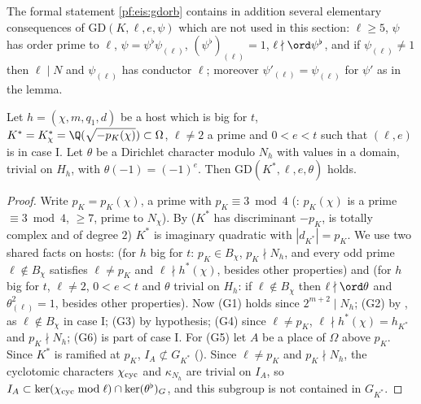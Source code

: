 \begin{remark}\label{pf:eis:gdrem}
The formal statement \cref{pf:eis:gdorb} contains in addition several elementary consequences of
$\mathrm{GD}(K,\ell,e,\psi)$ which are not used in this section: $\ell\ge5$, $\psi$ has order prime to $\ell$,
$\psi=\psi^\flat\psi_{(\ell)}$, $(\psi^\flat)_{(\ell)}=1$, $\ell\nmid\ord\psi^\flat$, and if $\psi_{(\ell)}\ne1$ then $\ell\mid N$ and
$\psi_{(\ell)}$ has conductor $\ell$; moreover $\psi'_{(\ell)}=\psi_{(\ell)}$ for $\psi'$ as in the lemma.
\end{remark}

\begin{lemma}\label{pf:eis:gdhost}
Let $h=(\chi,m,q_1,d)$ be a host which is big for $t$, $K^*=K^*_\chi=\Q(\sqrt{-p_K(\chi)})\subset\Omega$, $\ell\ne2$ a prime and
$0<e<t$ such that $(\ell,e)$ is in case I. Let $\theta$ be a Dirichlet character modulo $N_h$ with values in a domain,
trivial on $H_h$, with $\theta(-1)=(-1)^e$. Then $\mathrm{GD}(K^*,\ell,e,\theta)$ holds.
\end{lemma}

\begin{proof}
Write $p_K=p_K(\chi)$, a prime with $p_K\equiv3\bmod4$ (: $p_K(\chi)$ is a
prime $\equiv3\bmod4$, $\ge7$, prime to $N_\chi$). By  ($K^*$ has discriminant $-p_K$, is
totally complex and of degree $2$) $K^*$ is imaginary quadratic with $|d_{K^*}|=p_K$. We use two shared facts on
hosts:  (for $h$ big for $t$: $p_K\in B_\chi$, $p_K\nmid N_h$, and every odd prime
$\ell\notin B_\chi$ satisfies $\ell\ne p_K$ and $\ell\nmid h^*(\chi)$, besides other properties) and
 (for $h$ big for $t$, $\ell\ne2$, $0<e<t$ and $\theta$ trivial on $H_h$: if $\ell\notin B_\chi$ then
$\ell\nmid\ord\theta$ and $\theta_{(\ell)}^2=1$, besides other properties). Now (G1) holds since $2^{m+2}\mid N_h$; (G2) by
, as $\ell\notin B_\chi$ in case I; (G3) by hypothesis; (G4) since $\ell\ne p_K$,
$\ell\nmid h^*(\chi)=h_{K^*}$ and $p_K\nmid N_h$; (G6) is part of case I. For (G5) let $A$ be a place of $\Omega$ above $p_K$. Since
$K^*$ is ramified at $p_K$, $I_A\not\subset G_{K^*}$ (). Since $\ell\ne p_K$ and $p_K\nmid N_h$, the
cyclotomic characters $\chi_{\mathrm{cyc}}$ and $\kappa_{N_h}$ are trivial on $I_A$, so $I_A\subset\ker(\chi_{\mathrm{cyc}}\bmod\ell)\cap\ker(\theta^\flat)_G$,
and this subgroup is not contained in $G_{K^*}$.
\end{proof}

